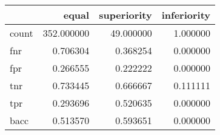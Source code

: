 \begin{tabular}{lrrr}
\toprule
{} &       equal &  superiority &  inferiority \\
\midrule
count &  352.000000 &    49.000000 &     1.000000 \\
fnr   &    0.706304 &     0.368254 &     0.000000 \\
fpr   &    0.266555 &     0.222222 &     0.000000 \\
tnr   &    0.733445 &     0.666667 &     0.111111 \\
tpr   &    0.293696 &     0.520635 &     0.000000 \\
bacc  &    0.513570 &     0.593651 &     0.000000 \\
\bottomrule
\end{tabular}
